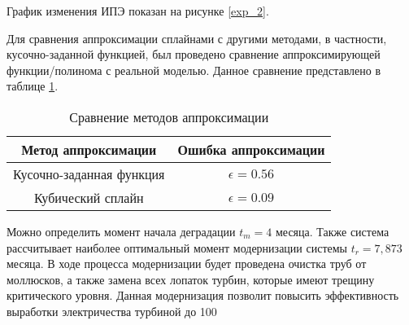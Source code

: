 График изменения ИПЭ показан на рисунке \ref{exp_2}.


Для сравнения аппроксимации сплайнами с другими методами, в частности, кусочно-заданной функцией, был проведено сравнение аппроксимирующей функции/полинома с реальной моделью.
Данное сравнение представлено в таблице \ref{table:compare}.
\begin{table}[H]
    \caption{Сравнение методов аппроксимации}
    \centering 
    \label{table:compare}
    \begin{tabular}{|c|c|}
        \hline
        Метод аппроксимации  & Ошибка аппроксимации  \\
        \hline
        Кусочно-заданная функция & $\epsilon=0.56$ \\
        \hline
        Кубический сплайн & $\epsilon=0.09$ \\
        \hline
    \end{tabular}
    \end{table}

Можно определить момент начала деградации $t_m=4$ месяца. 
Также система рассчитывает наиболее оптимальный момент модернизации системы $t_r=7,873$ месяца.
В ходе процесса модернизации будет проведена очистка труб от моллюсков, а также замена всех лопаток турбин, которые имеют трещину критического уровня.
Данная модернизация позволит повысить эффективность выработки электричества турбиной до 100%




